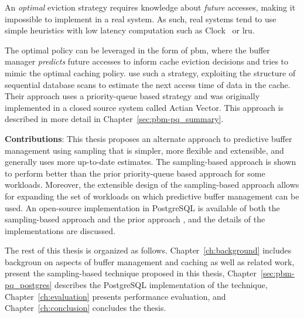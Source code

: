 An \textit{optimal} eviction strategy requires knowledge about \textit{future} accesses, making it impossible to implement in a real system. As such, real systems tend to use simple heuristics with low latency computation such as Clock~\cite{gclock} or \gls{lru}.

The optimal policy can be leveraged in the form of \gls{pbm}, where the buffer manager \textit{predicts} future accesses to inform cache eviction decisions and tries to mimic the optimal caching policy. \citet{pbm} use such a strategy, exploiting the structure of sequential database scans to estimate the next access time of data in the cache. Their approach uses a priority-queue based strategy and was originally implemented in a closed source system called Actian Vector. This approach is described in more detail in Chapter~\ref{sec:pbm-pq_summary}.

\textbf{Contributions}: This thesis proposes an alternate approach to predictive buffer management using sampling that is simpler, more flexible and extensible, and generally uses more up-to-date estimates. The sampling-based approach is shown to perform better than the prior priority-queue based approach for some workloads. Moreover, the extensible design of the sampling-based approach allows for expanding the set of workloads on which predictive buffer management can be used. An open-source implementation in PostgreSQL is available of both the sampling-based approach and the prior approach \cite{pbm}, and the details of the implementations are discussed.

The rest of this thesis is organized as follows. Chapter~\ref{ch:background} includes backgroun on aspects of buffer management and caching as well as related work,  present the sampling-based technique proposed in this thesis, Chapter~\ref{sec:pbm-pq_postgres} describes the PostgreSQL implementation of the technique, Chapter~\ref{ch:evaluation} presents performance evaluation, and Chapter~\ref{ch:conclusion} concludes the thesis.